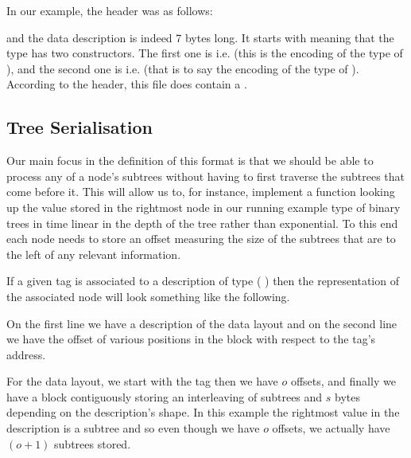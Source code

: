 In our example, the header was as follows:
\begin{hexdump}
 
\end{hexdump}
\noindent and the data description is indeed 7 bytes long. It starts with 
meaning that the type has two constructors.
The first one is  i.e. 
(this is the encoding of the type of ),
and the second one is  i.e.
\IdrisKeyword{(} 
\IdrisKeyword{(}  \IdrisKeyword{))}
(that is to say the encoding of the type of ).
%
According to the header, this file does contain a .

\subsection{Tree Serialisation}\label{sec:tree-serialisation}

Our main focus in the definition of this format is that we should be able
to process any of a node's subtrees without having to first traverse the
subtrees that come before it.
%
This will allow us to, for instance, implement a function looking up the
value stored in the rightmost node in our running example type of binary
trees in time linear in the depth of the tree rather than exponential.
%
To this end each node needs to store an offset measuring the size of the
subtrees that are to the left of any relevant information.

If a given tag is associated to a description of type
(   )
then the representation of the associated node will look something
like the following.

\label{fig:data-layout}
\begin{center}

\end{center}

On the first line we have a description of the data layout and on the
second line we have the offset of various positions in the block with
respect to the tag's address.

For the data layout,
we start with the tag
then we have $o$ offsets,
and finally we have a block contiguously storing an interleaving of
subtrees and $s$ bytes
depending on the description's shape.
%
In this example the rightmost value in the description is a subtree and
so even though we have $o$ offsets, we actually have $(o+1)$ subtrees stored.

